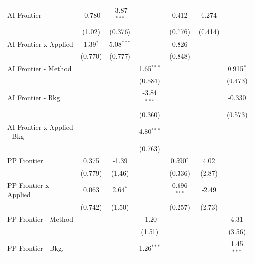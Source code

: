 \begin{tabular}{lcccccc}
   AI Frontier                    & -0.780     & -3.87$^{***}$ &               & 0.412         & 0.274   &   \\   
                                  & (1.02)     & (0.376)       &               & (0.776)       & (0.414) &   \\   
   AI Frontier x Applied          & 1.39$^{*}$ & 5.08$^{***}$  &               & 0.826         &         &   \\   
                                  & (0.770)    & (0.777)       &               & (0.848)       &         &   \\   
   AI Frontier - Method           &            &               & 1.65$^{***}$  &               &         & 0.915$^{*}$\\   
                                  &            &               & (0.584)       &               &         & (0.473)\\   
   AI Frontier - Bkg.             &            &               & -3.84$^{***}$ &               &         & -0.330\\   
                                  &            &               & (0.360)       &               &         & (0.573)\\   
   AI Frontier x Applied - Bkg.   &            &               & 4.80$^{***}$  &               &         &   \\   
                                  &            &               & (0.763)       &               &         &   \\   
   PP Frontier                    & 0.375      & -1.39         &               & 0.590$^{*}$   & 4.02    &   \\   
                                  & (0.779)    & (1.46)        &               & (0.336)       & (2.87)  &   \\   
   PP Frontier x Applied          & 0.063      & 2.64$^{*}$    &               & 0.696$^{***}$ & -2.49   &   \\   
                                  & (0.742)    & (1.50)        &               & (0.257)       & (2.73)  &   \\   
   PP Frontier - Method           &            &               & -1.20         &               &         & 4.31\\   
                                  &            &               & (1.51)        &               &         & (3.56)\\   
   PP Frontier - Bkg.             &            &               & 1.26$^{***}$  &               &         & 1.45$^{***}$\\   

\end{tabular}
